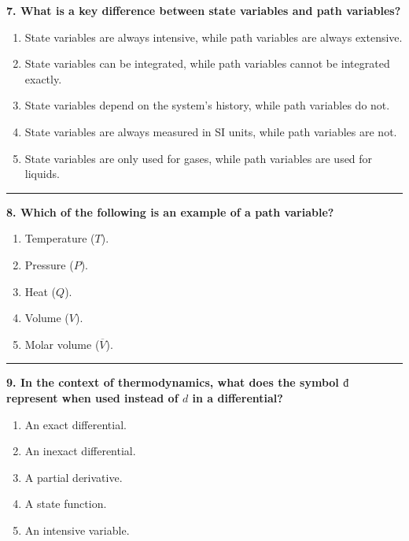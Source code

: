 \documentclass[
  9pt,
]{extbook}
\providecommand{\tightlist}{%
  \setlength{\itemsep}{0pt}\setlength{\parskip}{0pt}}
\theoremstyle{definition}
\theoremstyle{definition}
\theoremstyle{definition}
\theoremstyle{definition}
\theoremstyle{remark}
\begin{document}
\textbf{7. What is a key difference between state variables and path variables?}

\begin{enumerate}
\def\labelenumi{\alph{enumi}.}
\tightlist
\item
  State variables are always intensive, while path variables are always extensive.
\item
  State variables can be integrated, while path variables cannot be integrated exactly.
\item
  State variables depend on the system's history, while path variables do not.
\item
  State variables are always measured in SI units, while path variables are not.
\item
  State variables are only used for gases, while path variables are used for liquids.
\end{enumerate}

\begin{center}\rule{0.5\linewidth}{0.5pt}\end{center}

\textbf{8. Which of the following is an example of a path variable?}

\begin{enumerate}
\def\labelenumi{\alph{enumi}.}
\tightlist
\item
  Temperature (\(T\)).
\item
  Pressure (\(P\)).
\item
  Heat (\(Q\)).
\item
  Volume (\(V\)).
\item
  Molar volume (\(\overline{V}\)).
\end{enumerate}

\begin{center}\rule{0.5\linewidth}{0.5pt}\end{center}

\textbf{9. In the context of thermodynamics, what does the symbol \(đ\) represent when used instead of \(d\) in a differential?}

\begin{enumerate}
\def\labelenumi{\alph{enumi}.}
\tightlist
\item
  An exact differential.
\item
  An inexact differential.
\item
  A partial derivative.
\item
  A state function.
\item
  An intensive variable.
\end{enumerate}
\end{document}
